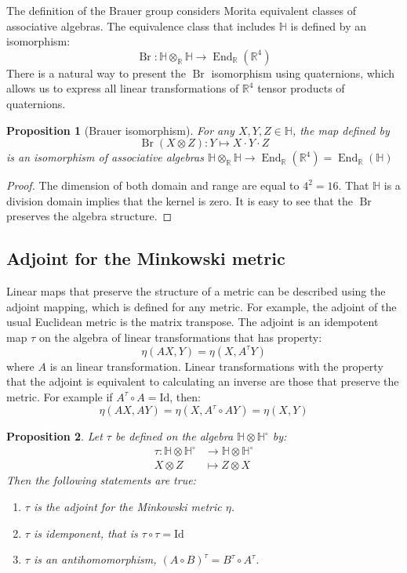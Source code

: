\documentclass{article}
\newcommand{\HH}{\mathbb{H}}
\newcommand{\RR}{\mathbb{R}}
\newcommand{\Br}{\operatorname{Br}}
\newcommand{\End}{\operatorname{End}}
\newtheorem{proposition}{Proposition}
\begin{document}
The definition of the Brauer group considers Morita equivalent classes of associative algebras.
The equivalence class that includes $\HH$ is defined by an isomorphism:
$$ \Br : \HH\otimes_\RR\HH \to \End_\RR(\RR^4) $$
There is a natural way to present the $\Br$ isomorphism using quaternions, which allows us to express all linear transformations of $\RR^4$ tensor products of quaternions.

\begin{proposition}[Brauer isomorphism]
  For any $X,Y,Z\in\HH$, the map defined by
$$ \Br(X\otimes Z) : Y \mapsto X\cdot Y\cdot Z $$
  is an isomorphism of associative algebras $\HH\otimes_\RR\HH \to \End_\RR(\RR^4) = \End_\RR(\HH)$\\
\end{proposition}

\begin{proof}
The dimension of both domain and range are equal to $4^2=16$.
That $\HH$ is a division domain implies that the kernel is zero.
It is easy to see that the $\Br$ preserves the algebra structure.
\end{proof}

\subsection{Adjoint for the Minkowski metric}

Linear maps that preserve the structure of a metric can be described using the adjoint mapping, which is defined for any metric.
For example, the adjoint of the usual Euclidean metric is the matrix transpose.
The adjoint is an idempotent map $\tau$ on the algebra of linear transformations that has property:
$$ \eta(A X, Y) = \eta(X, A^\tau Y) $$
where $A$ is an linear transformation.
Linear transformations with the property that the adjoint is equivalent to calculating an inverse are those that preserve the metric.
For example if $A^\tau\circ A = \textrm{Id}$, then:
$$ \eta(A X, A Y) = \eta(X, A^\tau\circ A Y) = \eta(X, Y) $$

\begin{proposition}
  \label{prop-adjoint}
  Let $\tau$ be defined on the algebra $\HH\otimes\HH^\circ$ by:
  \begin{align*}
    \tau : \HH\otimes\HH^\circ &\to\HH\otimes\HH^\circ \\
              X \otimes Z &\mapsto Z \otimes X
  \end{align*}
  Then the following statements are true:
  \begin{enumerate}
    \item $\tau$ is the adjoint  for the Minkowski metric $\eta$.
    \item $\tau$ is idemponent, that is $\tau \circ \tau = \mathrm{Id}$
    \item $\tau$ is an antihomomorphism, $(A\circ B)^\tau = B^\tau \circ A^\tau$.
  \end{enumerate}
\end{proposition}
\end{document}
